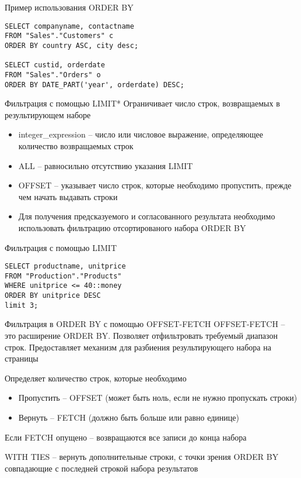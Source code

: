 \documentclass[12pt]{article}
\begin{document}
\begin{Example}{Пример использования ORDER BY}
\begin{lstlisting}
SELECT companyname, contactname 
FROM "Sales"."Customers" c 
ORDER BY country ASC, city desc;

SELECT custid, orderdate 
FROM "Sales"."Orders" o 
ORDER BY DATE_PART('year', orderdate) DESC;
\end{lstlisting}
\end{Example}

\begin{nota}{Фильтрация с помощью LIMIT*}
    Ограничивает число строк, возвращаемых в результирующем наборе 

    \begin{itemize}
        \item integer\_expression -- число или числовое выражение, определяющее количество возвращаемых строк 
        \item ALL -- равносильно отсутствию указания LIMIT
        \item OFFSET -- указывает число строк, которые необходимо пропустить, прежде чем начать выдавать строки 
        \item Для получения предсказуемого и согласованного результата необходимо использовать фильтрацию отсортированого набора ORDER BY
    \end{itemize}
\end{nota}

\begin{Example}{Фильтрация с помощью LIMIT}
\begin{lstlisting}
SELECT productname, unitprice
FROM "Production"."Products"
WHERE unitprice <= 40::money 
ORDER BY unitprice DESC
limit 3;
\end{lstlisting}
\end{Example}

\begin{nota}{Фильтрация в ORDER BY с помощью OFFSET-FETCH}
    OFFSET-FETCH -- это расширение ORDER BY. Позволяет отфильтровать требуемый диапазон строк. Предоставляет механизм для разбиения результирующего набора на страницы 

    Определяет количество строк, которые необходимо 

    \begin{itemize}
        \item Пропустить -- OFFSET (может быть ноль, если не нужно пропускать строки)
        \item Вернуть -- FETCH (должно быть больше или равно единице)
    \end{itemize}

    Если FETCH опущено -- возвращаются все записи до конца набора 

    WITH TIES -- вернуть дополнительные строки, с точки зрения ORDER BY совпадающие с последней строкой набора результатов
\end{nota}
\end{document}
